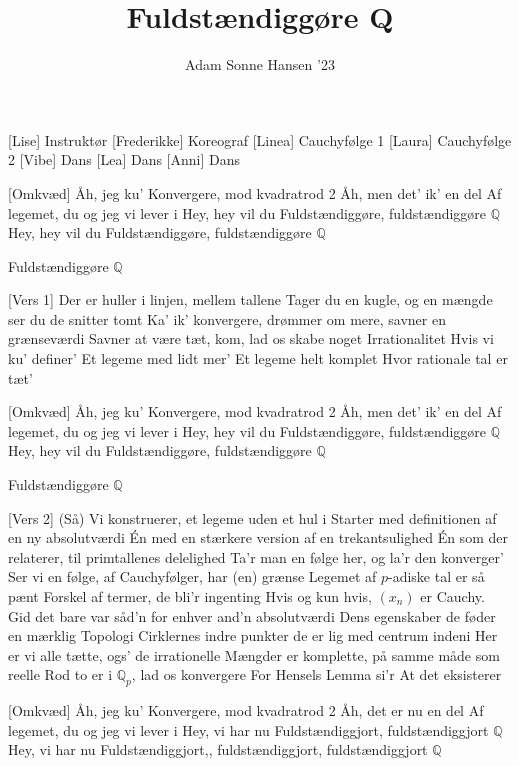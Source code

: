 \documentclass[a4paper,11pt]{article}
\title{Fuldstændiggøre Q}
\author{Adam Sonne Hansen '23}
\begin{document}
\maketitle

\begin{roles}
[Lise] Instruktør
[Frederikke] Koreograf
[Linea] Cauchyfølge 1
[Laura] Cauchyfølge 2
[Vibe] Dans
[Lea] Dans
[Anni] Dans
\end{roles}

\begin{song}
\sings{}[Omkvæd]
  Åh, jeg ku'
  Konvergere, mod kvadratrod 2
  Åh, men det' ik' en del
  Af legemet, du og jeg vi lever i
  Hey, hey vil du
  Fuldstændiggøre, fuldstændiggøre $\mathbb{Q}$
  Hey, hey vil du
  Fuldstændiggøre, fuldstændiggøre $\mathbb{Q}$

Fuldstændiggøre $\mathbb{Q}$

  \sings{}[Vers 1]
Der er huller i linjen, mellem tallene
Tager du en kugle, og en mængde ser du de snitter tomt
Ka' ik' konvergere, drømmer om mere, savner en grænseværdi
Savner at være tæt, kom, lad os skabe noget
Irrationalitet
Hvis vi ku' definer'
Et legeme med lidt mer'
Et legeme helt komplet
Hvor rationale tal er tæt'

\sings{}[Omkvæd]
  Åh, jeg ku'
  Konvergere, mod kvadratrod 2
  Åh, men det' ik' en del
  Af legemet, du og jeg vi lever i
  Hey, hey vil du
  Fuldstændiggøre, fuldstændiggøre $\mathbb{Q}$
  Hey, hey vil du
  Fuldstændiggøre, fuldstændiggøre $\mathbb{Q}$

  Fuldstændiggøre $\mathbb{Q}$
  
\sings{}[Vers 2]
(Så) Vi konstruerer, et legeme uden et hul i
Starter med definitionen af en ny  absolutværdi
Én med en stærkere version af en trekantsulighed
Én som der relaterer, til primtallenes delelighed
Ta'r man en følge her, og la'r den konverger'
Ser vi en følge, af Cauchyfølger, har (en) grænse
Legemet af $p$-adiske tal er så pænt 
Forskel af termer, de bli'r ingenting 
Hvis og kun hvis, $(x_n)$ er Cauchy.
Gid det bare var såd'n for enhver and'n absolutværdi
Dens egenskaber de føder en mærklig Topologi
Cirklernes indre punkter de er lig med centrum indeni
Her er vi alle tætte, ogs' de irrationelle 
Mængder er komplette, på samme måde som reelle
Rod to er i $\mathbb{Q}_p$, lad os konvergere
For Hensels Lemma si'r
At det eksisterer

\sings{}[Omkvæd]
  Åh, jeg ku'
  Konvergere, mod kvadratrod 2
  Åh, det er nu en del
  Af legemet, du og jeg vi lever i
  Hey, vi har nu
  Fuldstændiggjort, fuldstændiggjort $\mathbb{Q}$
  Hey, vi har nu
  Fuldstændiggjort,, fuldstændiggjort, fuldstændiggjort $\mathbb{Q}$
\end{song}
\end{document}
